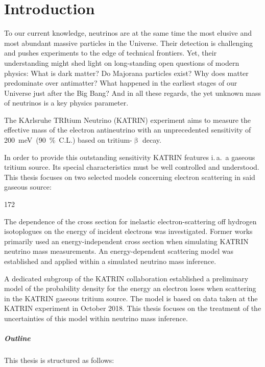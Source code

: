 \chapter{Introduction}
To our current knowledge, neutrinos are at the same time the most elusive and most abundant massive particles in the Universe. Their detection is challenging and pushes experiments to the edge of technical frontiers. Yet, their understanding might shed light on long-standing open questions of modern physics: What is dark matter? Do Majorana particles exist? Why does matter predominate over antimatter? What happened in the earliest stages of our Universe just after the Big Bang? And in all these regards, the yet unknown mass of neutrinos is a key physics parameter.

The KArlsruhe TRItium Neutrino (KATRIN) experiment aims to measure the effective mass of the electron antineutrino with an unprecedented sensitivity of \mbox{\SI{200}{meV} (\SI{90}{\percent} C.L.)} based on tritium-$\upbeta$ decay. 

In order to provide this outstanding sensitivity KATRIN features i.\,a.~a gaseous tritium source. Its special characteristics must be well controlled and understood. This thesis focuses on two selected models concerning electron scattering in said gaseous source: 
\begin{dingautolist}{172}
	\item\label{itm:introductionEDepCrossSec} The dependence of the cross section for inelastic electron-scattering off hydrogen isotoplogues on the energy of incident electrons was investigated. Former works primarily used an energy-independent cross section when simulating KATRIN neutrino mass measurements. An energy-dependent scattering model was established and applied within a simulated neutrino mass inference.
	\item\label{itm:introductionKatrinEloss} A dedicated subgroup of the KATRIN collaboration established a preliminary model of the probability density for the energy an electron loses when scattering in the KATRIN gaseous tritium source. The model is based on data taken at the KATRIN experiment in October 2018. This thesis focuses on the treatment of the uncertainties of this model within neutrino mass inference.
\end{dingautolist}

\paragraph{Outline}
This thesis is structured as follows:

